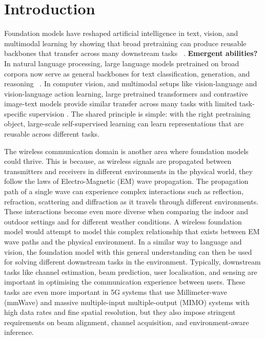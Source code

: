 \section{Introduction}
Foundation models have reshaped artificial intelligence in text, vision, and multimodal learning by showing that broad pretraining can produce reusable backbones that transfer across many downstream tasks ~\cite{bommasani2021opportunities,brown2020language,dosovitskiy2020image,radford2021clip}.  \textbf{Emergent abilities?} In natural language processing, large language models pretrained on broad corpora now serve as general backbones for text classification, generation, and reasoning ~\cite{devlin2019bert,vaswani2017attention, guo2025deepseek}. In computer vision, and multimodal setups like vision-language and vision-language action learning, large pretrained transformers and contrastive image-text models provide similar transfer across many tasks with limited task-specific supervision \cite{pmlr-v270-kim25c, alayrac2022flamingo,  dosovitskiy2020image,radford2021clip}. The shared principle is simple: with the right pretraining object, large-scale self-supervised learning can learn representations that are reusable across different tasks. 

The wireless communication domain is another area where foundation models could thrive. This is because, as wireless signals are propagated between transmitters and receivers in different environments in the physical world, they follow the laws of Electro-Magnetic (EM) wave propagation. The propagation path of a single wave can experience complex interactions such as reflection, refraction, scattering and diffraction as it travels through different environments. These interactions become even more diverse when comparing the indoor and outdoor settings and for different weather conditions. A wireless foundation model would attempt to model this complex relationship that exists between EM wave paths and the physical environment.  In a similar way to language and vision, the foundation model with this general understanding can then be used for solving different downstream tasks in the environment. Typically, downstream tasks like channel estimation, beam prediction, user localisation, and sensing are important in optimising the communication experience between users. These tasks are even more important in 5G systems that use Millimeter-wave (mmWave) and massive multiple-input multiple-output (MIMO) systems with high data rates and fine spatial resolution, but they also impose stringent requirements on beam alignment, channel acquisition, and environment-aware inference.

